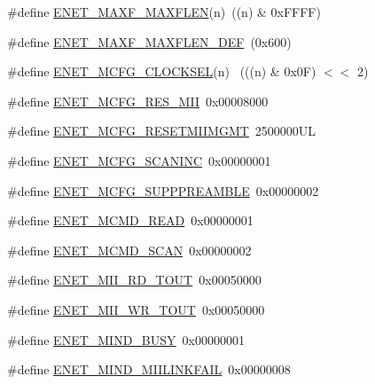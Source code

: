 \begin{DoxyCompactItemize}
\item 
\#define \hyperlink{group__ENET__17XX__40XX_gafa842b5b6e26b8e4890fcedf64d52a9a}{E\+N\+E\+T\+\_\+\+M\+A\+X\+F\+\_\+\+M\+A\+X\+F\+L\+EN}(n)~((n) \& 0x\+F\+F\+F\+F)
\item 
\#define \hyperlink{group__ENET__17XX__40XX_ga0b6f202981cfa586090cd4f29b16eaea}{E\+N\+E\+T\+\_\+\+M\+A\+X\+F\+\_\+\+M\+A\+X\+F\+L\+E\+N\+\_\+\+D\+EF}~(0x600)
\item 
\#define \hyperlink{group__ENET__17XX__40XX_ga6556edca61bde2ff55ec5791c6629709}{E\+N\+E\+T\+\_\+\+M\+C\+F\+G\+\_\+\+C\+L\+O\+C\+K\+S\+EL}(n)  ~(((n) \& 0x0\+F) $<$$<$ 2)
\item 
\#define \hyperlink{group__ENET__17XX__40XX_gaf31c596c785314febc778a974cefa64e}{E\+N\+E\+T\+\_\+\+M\+C\+F\+G\+\_\+\+R\+E\+S\+\_\+\+M\+II}~0x00008000
\item 
\#define \hyperlink{group__ENET__17XX__40XX_gafd634c8258b41a78b89aff1fa4558996}{E\+N\+E\+T\+\_\+\+M\+C\+F\+G\+\_\+\+R\+E\+S\+E\+T\+M\+I\+I\+M\+G\+MT}~2500000\+UL
\item 
\#define \hyperlink{group__ENET__17XX__40XX_gade8846eaaed89450478cf7e8dd07beb2}{E\+N\+E\+T\+\_\+\+M\+C\+F\+G\+\_\+\+S\+C\+A\+N\+I\+NC}~0x00000001
\item 
\#define \hyperlink{group__ENET__17XX__40XX_ga9f39657f690648231761d2aea5aee7cb}{E\+N\+E\+T\+\_\+\+M\+C\+F\+G\+\_\+\+S\+U\+P\+P\+P\+R\+E\+A\+M\+B\+LE}~0x00000002
\item 
\#define \hyperlink{group__ENET__17XX__40XX_ga07dfdda78003dd5af6254fc863ae019e}{E\+N\+E\+T\+\_\+\+M\+C\+M\+D\+\_\+\+R\+E\+AD}~0x00000001
\item 
\#define \hyperlink{group__ENET__17XX__40XX_ga77d7e45ecfbd3f0bace6900cc69b8beb}{E\+N\+E\+T\+\_\+\+M\+C\+M\+D\+\_\+\+S\+C\+AN}~0x00000002
\item 
\#define \hyperlink{group__ENET__17XX__40XX_ga68db523c6f21026af56d79f5af27b9d1}{E\+N\+E\+T\+\_\+\+M\+I\+I\+\_\+\+R\+D\+\_\+\+T\+O\+UT}~0x00050000
\item 
\#define \hyperlink{group__ENET__17XX__40XX_ga41de953453bd483f8c9d5805c54010b3}{E\+N\+E\+T\+\_\+\+M\+I\+I\+\_\+\+W\+R\+\_\+\+T\+O\+UT}~0x00050000
\item 
\#define \hyperlink{group__ENET__17XX__40XX_ga9431ce0c183ce96c4fe9956d850f1f5e}{E\+N\+E\+T\+\_\+\+M\+I\+N\+D\+\_\+\+B\+U\+SY}~0x00000001
\item 
\#define \hyperlink{group__ENET__17XX__40XX_gad05320f311da8c5386dfbbe950eca62b}{E\+N\+E\+T\+\_\+\+M\+I\+N\+D\+\_\+\+M\+I\+I\+L\+I\+N\+K\+F\+A\+IL}~0x00000008
\item 
$$
\end{DoxyCompactItemize}
